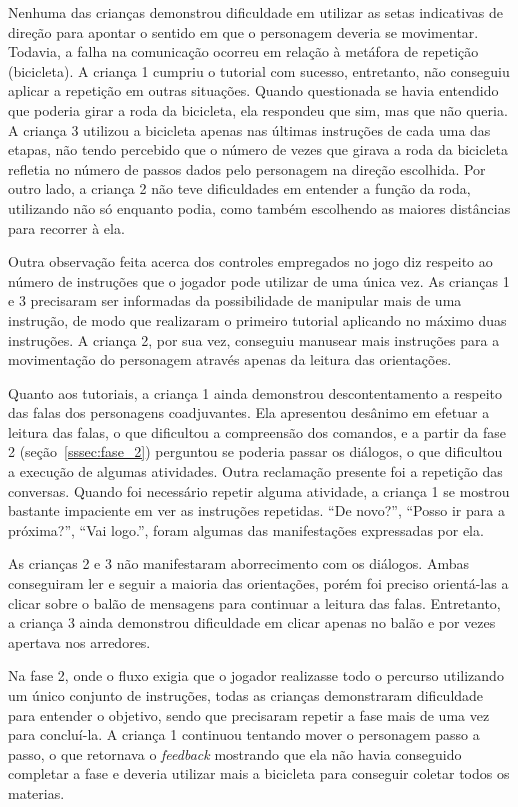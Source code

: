 Nenhuma das crianças demonstrou dificuldade em utilizar as setas indicativas de direção para apontar o sentido em que o personagem deveria se movimentar. Todavia, a falha na comunicação ocorreu em relação à metáfora de repetição (bicicleta). A criança 1 cumpriu o tutorial com sucesso, entretanto, não conseguiu aplicar a repetição em outras situações. Quando questionada se havia entendido que poderia girar a roda da bicicleta, ela respondeu que sim, mas que não queria. A criança 3 utilizou a bicicleta apenas nas últimas instruções de cada uma das etapas, não tendo percebido que o número de vezes que girava a roda da bicicleta refletia no número de passos dados pelo personagem na direção escolhida. Por outro lado, a criança 2 não teve dificuldades em entender a função da roda, utilizando não só enquanto podia, como também escolhendo as maiores distâncias para recorrer à ela.

Outra observação feita acerca dos controles empregados no jogo diz respeito ao número de instruções que o jogador pode utilizar de uma única vez. As crianças 1 e 3 precisaram ser informadas da possibilidade de manipular mais de uma instrução, de modo que realizaram o primeiro tutorial aplicando no máximo duas instruções. A criança 2, por sua vez, conseguiu manusear mais instruções para a movimentação do personagem através apenas da leitura das orientações.

Quanto aos tutoriais, a criança 1 ainda demonstrou descontentamento a respeito das falas dos personagens coadjuvantes. Ela apresentou desânimo em efetuar a leitura das falas, o que dificultou a compreensão dos comandos, e a partir da fase 2 (seção~\ref{sssec:fase_2}) perguntou se poderia passar os diálogos, o que dificultou a execução de algumas atividades. Outra reclamação presente foi a repetição das conversas. Quando foi necessário repetir alguma atividade, a criança 1 se mostrou bastante impaciente em ver as instruções repetidas. “De novo?”, “Posso ir para a próxima?”, “Vai logo.”, foram algumas das manifestações expressadas por ela.

As crianças 2 e 3 não manifestaram aborrecimento com os diálogos. Ambas conseguiram ler e seguir a maioria das orientações, porém foi preciso orientá-las a clicar sobre o balão de mensagens para continuar a leitura das falas. Entretanto, a criança 3 ainda demonstrou dificuldade em clicar apenas no balão e por vezes apertava nos arredores.

Na fase 2, onde o fluxo exigia que o jogador realizasse todo o percurso utilizando um único conjunto de instruções, todas as crianças demonstraram dificuldade para entender o objetivo, sendo que precisaram repetir a fase mais de uma vez para concluí-la. A criança 1 continuou tentando mover o personagem passo a passo, o que retornava o \textit{feedback} mostrando que ela não havia conseguido completar a fase e deveria utilizar mais a bicicleta para conseguir coletar todos os materias.


